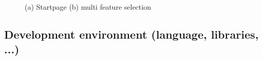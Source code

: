 \documentclass[runningheads]{llncs}
\begin{document}
\begin{figure}
    \centering
    \caption{(a) Startpage (b) multi feature selection}
    \label{fig:gui}
\end{figure}

\subsection{Development environment (language, libraries, ...)}
\end{document}
